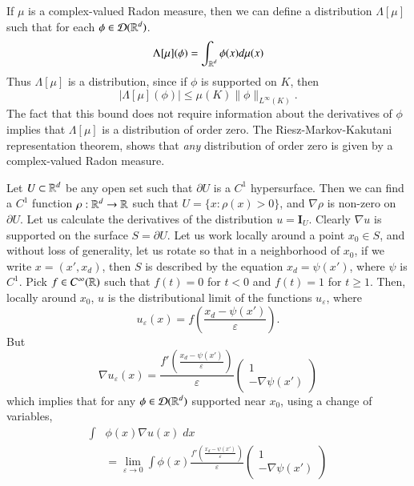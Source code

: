 \begin{example}
    If $\mu$ is a complex-valued Radon measure, then we can define a distribution $\Lambda[\mu]$ such that for each $\phi \in \operatorname{\mathcal{D}}(\operatorname{\mathbb{R}}^d)$.
    \[ \Lambda[\mu](\phi) = \int_{\operatorname{\mathbb{R}}^d} \phi(x) d\mu(x) \]
    Thus $\Lambda[\mu]$ is a distribution, since if $\phi$ is supported on $K$, then
    \[ |\Lambda[\mu](\phi)| \leq \mu(K) \| \phi \|_{L^\infty(K)}. \]
    The fact that this bound does not require information about the derivatives of $\phi$ implies that $\Lambda[\mu]$ is a distribution of order zero. The Riesz-Markov-Kakutani representation theorem, shows that \emph{any} distribution of order zero is given by a complex-valued Radon measure.
\end{example}

\begin{example}
    Let $U \subset \operatorname{\mathbb{R}}^d$ be any open set such that $\partial U$ is a $C^1$ hypersurface. Then we can find a $C^1$ function $\rho: \operatorname{\mathbb{R}}^d \to \operatorname{\mathbb{R}}$ such that $U = \{ x : \rho(x) > 0 \}$, and $\nabla \rho$ is non-zero on $\partial U$. Let us calculate the derivatives of the distribution $u = \mathbf{I}_U$. Clearly $\nabla u$ is supported on the surface $S = \partial U$. Let us work locally around a point $x_0 \in S$, and without loss of generality, let us rotate so that in a neighborhood of $x_0$, if we write $x = (x',x_d)$, then $S$ is described by the equation $x_d = \psi(x')$, where $\psi$ is $C^1$. Pick $f \in C^\infty(\operatorname{\mathbb{R}})$ such that $f(t) = 0$ for $t < 0$ and $f(t) = 1$ for $t \geq 1$. Then, locally around $x_0$, $u$ is the distributional limit of the functions $u_\varepsilon$, where
    \[ u_\varepsilon(x) = f \left( \frac{x_d - \psi(x')}{\varepsilon} \right). \]
    But
    \[ \nabla u_\varepsilon(x) = \frac{f' \left( \frac{x_d - \psi(x')}{\varepsilon} \right)}{\varepsilon} \begin{pmatrix} 1 \\ - \nabla \psi(x') \end{pmatrix} \]
    which implies that for any $\phi \in \operatorname{\mathcal{D}}(\operatorname{\mathbb{R}}^d)$ supported near $x_0$, using a change of variables,
    \begin{align*}
        \int &\phi(x) \nabla u(x)\; dx\\
        &= \lim_{\varepsilon \to 0} \int \phi(x) \frac{f' \left( \frac{x_d - \psi(x')}{\varepsilon} \right)}{\varepsilon} \begin{pmatrix} 1 \\ - \nabla \psi(x') \end{pmatrix}\\

\end{align*}
\end{example}
